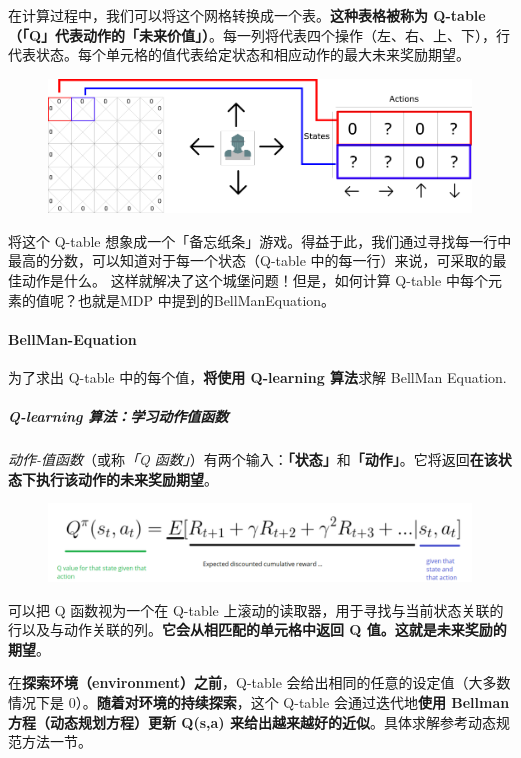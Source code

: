 \documentclass[UTF8,a4paper,12pt]{ctexbook}
\begin{document}
					在计算过程中，我们可以将这个网格转换成一个表。\textbf{这种表格被称为 Q-table（「Q」代表动作的「未来价值」）}。每一列将代表四个操作（左、右、上、下），行代表状态。每个单元格的值代表给定状态和相应动作的最大未来奖励期望。
					\begin{figure}[H]
						\centering
						\includegraphics[width=.9\linewidth]{policy02_1}
					\end{figure}
					
					将这个 Q-table 想象成一个「备忘纸条」游戏。得益于此，我们通过寻找每一行中最高的分数，可以知道对于每一个状态（Q-table 中的每一行）来说，可采取的最佳动作是什么。
					这样就解决了这个城堡问题！但是，如何计算 Q-table 中每个元素的值呢？也就是MDP 中提到的BellManEquation。
										
			\paragraph{BellMan-Equation}
				为了求出 Q-table 中的每个值，\textbf{将使用 Q-learning 算法}求解 BellMan Equation. 
				
				\subparagraph{Q-learning 算法：学习动作值函数}
					\textit{动作-值函数}（或称\textit{「Q 函数」}）有两个输入：\textbf{「状态」}和\textbf{「动作」}。它将返回\textbf{在该状态下执行该动作的未来奖励期望}。
					
					\begin{figure}[H]
						\centering
						\includegraphics[width=\linewidth]{qFunc}
					\end{figure}
					
					可以把 Q 函数视为一个在 Q-table 上滚动的读取器，用于寻找与当前状态关联的行以及与动作关联的列。\textbf{它会从相匹配的单元格中返回 Q 值。这就是未来奖励的期望}。
					
					在\textbf{探索环境（environment）之前}，Q-table 会给出相同的任意的设定值（大多数情况下是 0）。\textbf{随着对环境的持续探索}，这个 Q-table 会通过迭代地\textbf{使用 Bellman 方程（动态规划方程）更新 Q(s,a) 来给出越来越好的近似}。具体求解参考动态规范方法一节。
					
\end{document}
